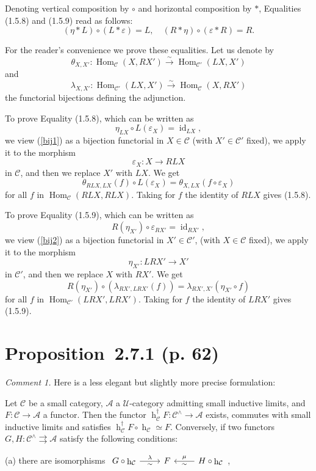 \documentclass[12pt]{article}
\theoremstyle{remark}
\newcommand{\n}{\noindent}
\newcommand{\A}{\mathcal A}
\newcommand{\C}{\mathcal C}
\newcommand{\U}{\mathcal U}
\newcommand{\e}{\varepsilon}
\newcommand{\pr}{Proposition}
\DeclareMathOperator{\hy}{h}
\DeclareMathOperator{\id}{id}
\DeclareMathOperator{\Hom}{Hom}
\begin{document}
Denoting vertical composition by $\circ$ and horizontal composition by $*$, Equalities (1.5.8) and (1.5.9) read as follows: 
$$
(\eta*L)\circ(L*\e)=L,\quad (R*\eta)\circ(\e*R)=R.
$$ 

For the reader's convenience we prove these equalities. Let us denote by 
\begin{equation}\label{bij1}
\theta_{X,X'}:\Hom_\C(X,RX')\overset\sim\to\Hom_{\C'}(LX,X')
\end{equation}
and
\begin{equation}\label{bij2}
\lambda_{X,X'}:\Hom_{\C'}(LX,X')\overset\sim\to\Hom_\C(X,RX')
\end{equation}
the functorial bijections defining the adjunction. 

To prove Equality (1.5.8), which can be written as 
$$
\eta_{LX}\circ L(\e_X)=\id_{LX},
$$
we view (\ref{bij1}) as a bijection functorial in $X\in\C$ (with $X'\in\C'$ fixed), we apply it to the morphism 
$$
\e_X:X\to RLX
$$ 
in $\C$, and then we replace $X'$ with $LX$. We get 
$$
\theta_{RLX,LX}(f)\circ L(\e_X)=\theta_{X,LX}(f\circ\e_X)
$$
for all $f$ in $\Hom_\C(RLX,RLX)$. Taking for $f$ the identity of $RLX$ gives (1.5.8).

To prove Equality (1.5.9), which can be written as 
$$
R(\eta_{X'})\circ\e_{RX'}=\id_{RX'},
$$
we view (\ref{bij2}) as a bijection functorial in $X'\in\C'$, (with $X\in\C$ fixed), we apply it to the morphism 
$$
\eta_{X'}:LRX'\to X'
$$ 
in $\C'$, and then we replace $X$ with $RX'$. We get 
$$
R(\eta_{X'})\circ(\lambda_{RX',LRX'}(f))=\lambda_{RX',X'}(\eta_{X'}\circ f)
$$
for all $f$ in $\Hom_{\C'}(LRX',LRX')$. Taking for $f$ the identity of $LRX'$ gives (1.5.9). 
% 
\section{\pr\ 2.7.1 (p. 62)}\label{s271}%
% 
{\em Comment 1.} Here is a less elegant but slightly more precise formulation: 

Let $\C$ be a small category, $\A$ a $\U$-category admitting small inductive limits, and $F:\C\to\A$ a functor. Then the functor $\hy_\C^\dagger F:\C^\wedge\to\A$ exists, commutes with small inductive limits and satisfies $\hy_\C^\dagger F\circ\hy_\C\simeq F$. Conversely, if two functors $G,H:\C^\wedge\rightrightarrows\A$ satisfy the following conditions: 

\n(a) there are isomorphisms $\begin{tikzcd}
G\circ\hy_\C\ar{r}{\lambda}[swap]{\sim}&F&H\circ\hy_\C\ar{l}{\sim}[swap]{\mu}\end{tikzcd}$, 
\end{document}
